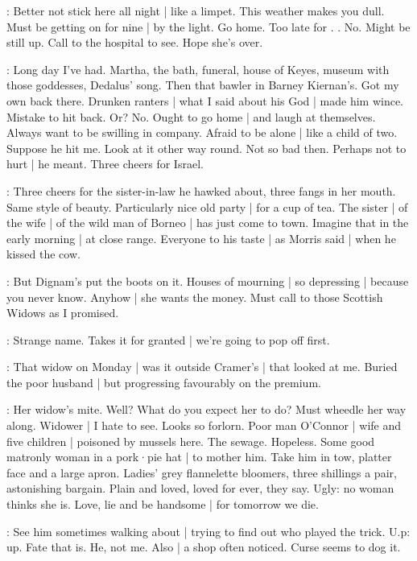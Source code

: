 \BloomCurrent:
Better not stick here all night |
like a limpet.
This weather makes you dull.
Must be getting on for nine |
by the light.
Go home.
Too late for .
.
No.
Might be still up.
Call to the hospital to see.
Hope she's over.

\BloomToday:
Long day I've had.
Martha,
the bath,
funeral,
house of Keyes,
museum with those goddesses,
Dedalus' song.
Then that bawler in Barney Kiernan's.
Got my own back there.
Drunken ranters |
what I said about his God |
made him wince.
Mistake to hit back.
Or?
No.
Ought to go home |
and laugh at themselves.
Always want to be swilling in company.
Afraid to be alone |
like a child of two.
Suppose he hit me.
Look at it other way round.
Not so bad then.
Perhaps not to hurt |
he meant.%
Three cheers for Israel.

\BloomAbstract:
Three cheers for the sister-in-law he hawked about,
three fangs in her mouth.
Same style of beauty.
Particularly nice old party |
for a cup of tea.
The sister |
of the wife |
of the wild man of Borneo |
has just come to town.
Imagine that in the early morning |
at close range.
Everyone to his taste |
as Morris said |
when he kissed the cow.

\BloomToday:
But Dignam's put the boots on it.
Houses of mourning |
so depressing |
because you never know.
Anyhow |
she wants the money.
Must call to those Scottish Widows
as I promised.

\BloomAbstract:
Strange name.
Takes it for granted |
we're going to pop off first.

\BloomHist:
That widow on Monday |
was it outside Cramer's |
that looked at me.
Buried the poor husband |
but progressing favourably on the premium.%

\BloomAbstract:
Her widow's mite.
Well?
What do you expect her to do?
Must wheedle her way along.
Widower |
I hate to see.
Looks so forlorn.
Poor man O'Connor |
wife and five children |
poisoned by mussels here.
The sewage.
Hopeless.
Some good matronly woman in a pork·pie hat |
to mother him.
Take him in tow,
platter face and a large apron.
Ladies' grey flannelette bloomers,
three shillings a pair,
astonishing bargain.
Plain and loved,
loved for ever,
they say.
Ugly:
no woman thinks she is.
Love,
lie
and be handsome |
for tomorrow we die.

\BloomToday:
See him sometimes walking about |
trying to find out who played the trick.
U.p:
up.
Fate that is.
He,
not me.
Also |
a shop often noticed.
Curse seems to dog it.

